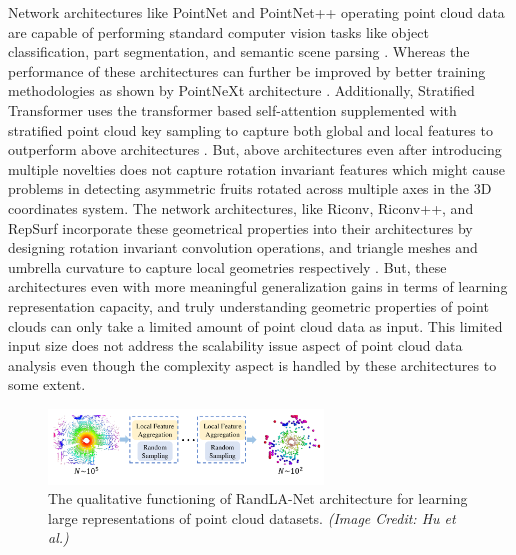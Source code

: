 \documentclass{article}
\begin{document}
Network architectures like PointNet and PointNet++ operating point cloud data are capable of performing standard computer vision tasks like object classification, part segmentation, and semantic scene parsing \cite{qi2017pointnet, qi2017pointnet++}.
Whereas the performance of these architectures can further be improved by better training methodologies as shown by PointNeXt architecture \cite{qian2022pointnext}.
Additionally, Stratified Transformer uses the transformer based self-attention supplemented with stratified point cloud key sampling to capture both global and local features to outperform above architectures \cite{lai2022stratified}.
But, above architectures even after introducing multiple novelties does not capture rotation invariant features which might cause problems in detecting asymmetric fruits rotated across multiple axes in the 3D coordinates system.
The network architectures, like Riconv, Riconv++, and RepSurf incorporate these geometrical properties into their architectures by designing rotation invariant convolution operations, and triangle meshes and umbrella curvature to capture local geometries respectively \cite{zhang2019rotation, zhang2022riconv++, ran2022surface}.
But, these architectures even with more meaningful generalization gains in terms of learning representation capacity, and truly understanding geometric properties of point clouds can only take a limited amount of point cloud data as input.
This limited input size does not address the scalability issue aspect of point cloud data analysis even though the complexity aspect is handled by these architectures to some extent.


\begin{figure}[h]
    \centering
    \includegraphics[width=0.65\textwidth]{randla-net-working.png}
    \caption{The qualitative functioning of RandLA-Net architecture for learning large representations of point cloud datasets. \textit{(Image Credit: Hu et al.)}}
    \label{fig:randla-net}
\end{figure}
\end{document}
